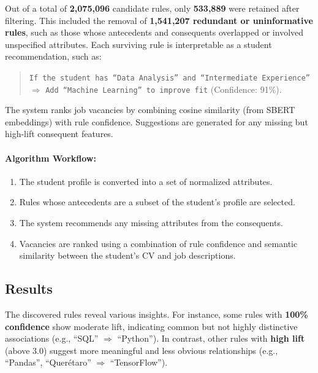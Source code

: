 \documentclass[runningheads]{llncs}
\begin{document}
	Out of a total of \textbf{2,075,096} candidate rules, only \textbf{533,889} were retained after filtering. This included the removal of \textbf{1,541,207 redundant or uninformative rules}, such as those whose antecedents and consequents overlapped or involved unspecified attributes. Each surviving rule is interpretable as a student recommendation, such as:
	
	\begin{quote}
		\small
		\texttt{If the student has “Data Analysis” and “Intermediate Experience”} $\Rightarrow$ \texttt{Add “Machine Learning” to improve fit} (Confidence: 91\%).
	\end{quote}
	
	The system ranks job vacancies by combining cosine similarity (from SBERT embeddings) with rule confidence. Suggestions are generated for any missing but high-lift consequent features.
	
	\vspace{0.5em}
	
	
	\paragraph{Algorithm Workflow:}
	\begin{enumerate}
		\item The student profile is converted into a set of normalized attributes.
		\item Rules whose antecedents are a subset of the student's profile are selected.
		\item The system recommends any missing attributes from the consequents.
		\item Vacancies are ranked using a combination of rule confidence and semantic similarity between the student's CV and job descriptions.
	\end{enumerate}
	
	\subsection{Results}
	
	The discovered rules reveal various insights. For instance, some rules with \textbf{100\% confidence} show moderate lift, indicating common but not highly distinctive associations (e.g., ``SQL'' $\Rightarrow$ ``Python''). In contrast, other rules with \textbf{high lift} (above 3.0) suggest more meaningful and less obvious relationships (e.g., ``Pandas'', ``Querétaro'' $\Rightarrow$ ``TensorFlow'').
	
\end{document}
